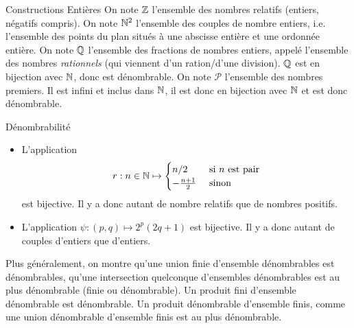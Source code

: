\documentclass{cours}
\begin{document}
    \begin{définition}{Constructions Entières}{}
        On note $\mathbb{Z}$ l'ensemble des nombres relatifs (entiers, négatifs compris). On note $\mathbb{N}^{2}$ l'ensemble des couples de nombre entiers, i.e. l'ensemble des points du plan situés à une abscisse entière et une ordonnée entière. On note $\mathbb{Q}$ l'ensemble des fractions de nombres entiers, appelé l'ensemble des nombres \emph{rationnels} (qui viennent d'un ration/d'une division). $\mathbb{Q}$ est en bijection avec $\mathbb{N}$, donc est dénombrable. On note $\mathcal{P}$ l'ensemble des nombres premiers. Il est infini et inclus dans $\mathbb{N}$, il est donc en bijection avec $\mathbb{N}$ et est donc dénombrable.
    \end{définition}

    \begin{propositionfr}{Dénombrabilité}{}
        \begin{itemize}
            \item L'application \[
                r : n \in \mathbb{N} \mapsto \begin{cases} n/2 & \text{ si } n \text{ est pair}\\ -\frac{n+1}{2} & \text{ sinon}
                \end{cases}
                    \]
                est bijective. Il y a donc autant de nombre relatifs que de nombres positifs.
            \item L'application $\psi : (p, q) \mapsto 2^{p}(2q + 1)$ est bijective. Il y a donc autant de couples d'entiers que d'entiers.
        \end{itemize}
    \end{propositionfr}

    \begin{remarque}{}{}
        Plus généralement, on montre qu'une union finie d'ensemble dénombrables est dénombrables, qu'une intersection quelconque d'ensembles dénombrables est au plus dénombrable (finie ou dénombrable). Un produit fini d'ensemble dénombrable est dénombrable. Un produit dénombrable d'ensemble finis, comme une union dénombrable d'ensemble finis est au plus dénombrable. 
    \end{remarque}
\end{document}
